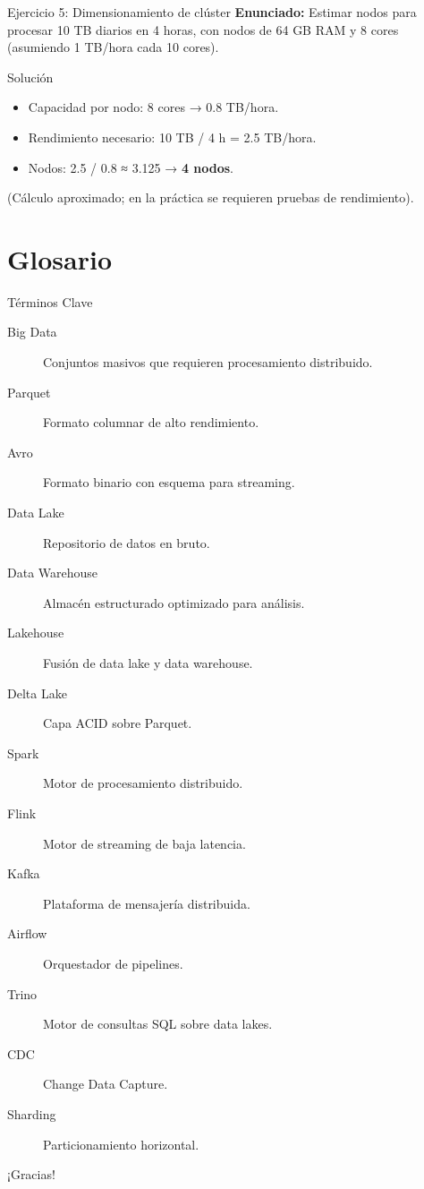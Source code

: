 \documentclass[aspectratio=169, 10pt, xcolor=table]{beamer}
\begin{document}
\begin{frame}{Ejercicio 5: Dimensionamiento de clúster}
    \textbf{Enunciado:} Estimar nodos para procesar 10 TB diarios en 4 horas, con nodos de 64 GB RAM y 8 cores (asumiendo 1 TB/hora cada 10 cores).
    \begin{block}{Solución}
        \begin{itemize}
            \item Capacidad por nodo: 8 cores → 0.8 TB/hora.
            \item Rendimiento necesario: 10 TB / 4 h = 2.5 TB/hora.
            \item Nodos: 2.5 / 0.8 ≈ 3.125 → \textbf{4 nodos}.
        \end{itemize}
        (Cálculo aproximado; en la práctica se requieren pruebas de rendimiento).
    \end{block}
\end{frame}

\section{Glosario}

\begin{frame}{Términos Clave}
    \begin{description}
        \item[Big Data] Conjuntos masivos que requieren procesamiento distribuido.
        \item[Parquet] Formato columnar de alto rendimiento.
        \item[Avro] Formato binario con esquema para streaming.
        \item[Data Lake] Repositorio de datos en bruto.
        \item[Data Warehouse] Almacén estructurado optimizado para análisis.
        \item[Lakehouse] Fusión de data lake y data warehouse.
        \item[Delta Lake] Capa ACID sobre Parquet.
        \item[Spark] Motor de procesamiento distribuido.
        \item[Flink] Motor de streaming de baja latencia.
        \item[Kafka] Plataforma de mensajería distribuida.
        \item[Airflow] Orquestador de pipelines.
        \item[Trino] Motor de consultas SQL sobre data lakes.
        \item[CDC] Change Data Capture.
        \item[Sharding] Particionamiento horizontal.
    \end{description}
\end{frame}

\begin{frame}
    \centering

    
    \vspace{1cm}
    \large ¡Gracias!
\end{frame}
\end{document}
